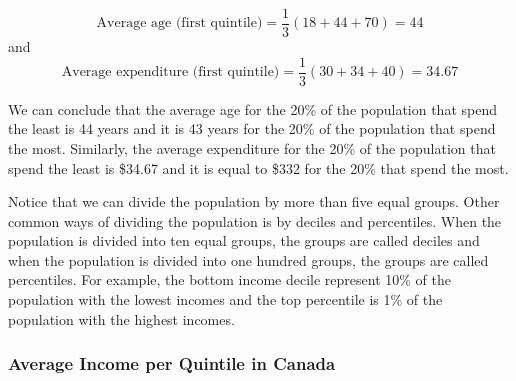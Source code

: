 \documentclass[letterpaper]{article}\usepackage[]{graphicx}\usepackage[]{color}
\numberwithin{exer}{section}
\theoremstyle{nonumberplain}
\begin{document}
\[
\mbox{Average age (first quintile)} = \frac{1}{3}(18 + 
44 + 70)=44
\]
and
\[
\mbox{Average expenditure (first quintile)} = \frac{1}{3}(30 + 
34 + 40)=34.67
\]
\begin{center}
\end{center}
We can conclude that the average age for the 20\% of the population
that spend the least is 44 years and it is 43
years for the 20\% of the population that spend the most. Similarly,
the average expenditure for the 20\% of the population that spend the
least is \$34.67 and it is equal to \$332 for the
20\% that spend the most.

Notice that we can divide the population by more than five equal
groups. Other common ways of dividing the population is by deciles and
percentiles. When the population is divided into ten equal groups, the
groups are called deciles and when the population is divided into one
hundred groups, the groups are called percentiles. For example, the
bottom income decile represent 10\% of the population with the lowest
incomes and the top percentile is 1\% of the population with the
highest incomes.

\subsubsection*{Average Income per Quintile in Canada}
\end{document}
